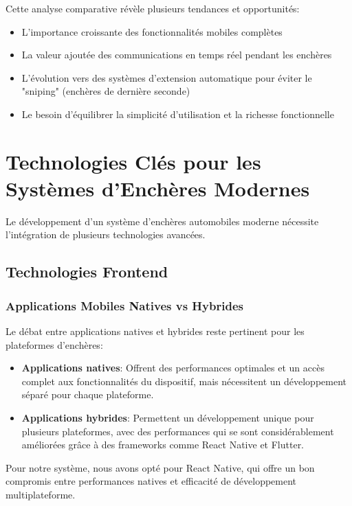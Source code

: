 Cette analyse comparative révèle plusieurs tendances et opportunités:

\begin{itemize}
    \item L'importance croissante des fonctionnalités mobiles complètes
    \item La valeur ajoutée des communications en temps réel pendant les enchères
    \item L'évolution vers des systèmes d'extension automatique pour éviter le "sniping" (enchères de dernière seconde)
    \item Le besoin d'équilibrer la simplicité d'utilisation et la richesse fonctionnelle
\end{itemize}

\section{Technologies Clés pour les Systèmes d'Enchères Modernes}

Le développement d'un système d'enchères automobiles moderne nécessite l'intégration de plusieurs technologies avancées.

\subsection{Technologies Frontend}

\subsubsection{Applications Mobiles Natives vs Hybrides}

Le débat entre applications natives et hybrides reste pertinent pour les plateformes d'enchères:

\begin{itemize}
    \item \textbf{Applications natives}: Offrent des performances optimales et un accès complet aux fonctionnalités du dispositif, mais nécessitent un développement séparé pour chaque plateforme.
    
    \item \textbf{Applications hybrides}: Permettent un développement unique pour plusieurs plateformes, avec des performances qui se sont considérablement améliorées grâce à des frameworks comme React Native et Flutter.
\end{itemize}

Pour notre système, nous avons opté pour React Native, qui offre un bon compromis entre performances natives et efficacité de développement multiplateforme.

